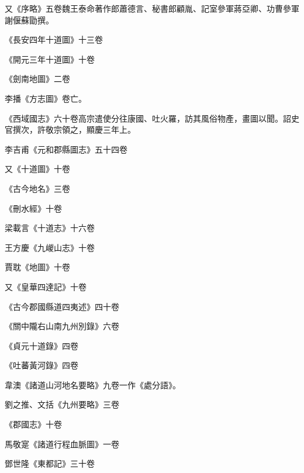 \begin{pinyinscope}
 又《序略》五卷魏王泰命著作郎蕭德言、秘書郎顧胤、記室參軍蔣亞卿、功曹參軍謝偃蘇勖撰。



 《長安四年十道圖》十三卷



 《開元三年十道圖》十卷



 《劍南地圖》二卷



 李播《方志圖》卷亡。



 《西域國志》六十卷高宗遣使分往康國、吐火羅，訪其風俗物產，畫圖以聞。詔史官撰次，許敬宗領之，顯慶三年上。



 李吉甫《元和郡縣圖志》五十四卷



 又《十道圖》十卷



 《古今地名》三卷



 《刪水經》十卷



 梁載言《十道志》十六卷



 王方慶《九嵕山志》十卷



 賈耽《地圖》十卷



 又《皇華四達記》十卷



 《古今郡國縣道四夷述》四十卷



 《關中隴右山南九州別錄》六卷



 《貞元十道錄》四卷



 《吐蕃黃河錄》四卷



 韋澳《諸道山河地名要略》九卷一作《處分語》。



 劉之推、文括《九州要略》三卷



 《郡國志》十卷



 馬敬寔《諸道行程血脈圖》一卷



 鄧世隆《東都記》三十卷




\end{pinyinscope}
